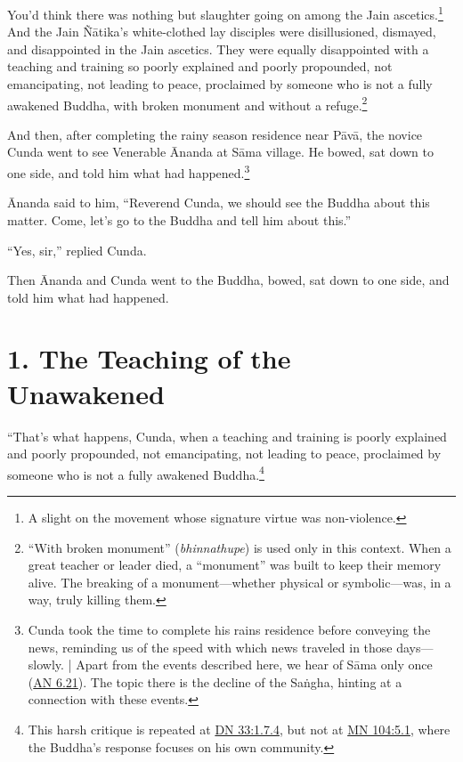 \documentclass[12pt,openany]{book}%
\begin{document}
You’d think there was nothing but slaughter going on among the Jain ascetics.\footnote{A slight on the movement whose signature virtue was non-violence. } And the Jain \textsanskrit{Ñātika}’s white-clothed lay disciples were disillusioned, dismayed, and disappointed in the Jain ascetics. They were equally disappointed with a teaching and training so poorly explained and poorly propounded, not emancipating, not leading to peace, proclaimed by someone who is not a fully awakened Buddha, with broken monument and without a refuge.\footnote{“With broken monument” (\textit{bhinnathupe}) is used only in this context. When a great teacher or leader died, a “monument” was built to keep their memory alive. The breaking of a monument—whether physical or symbolic—was, in a way, truly killing them. } 

And then, after completing the rainy season residence near \textsanskrit{Pāvā}, the novice Cunda went to see Venerable Ānanda at \textsanskrit{Sāma} village. He bowed, sat down to one side, and told him what had happened.\footnote{Cunda took the time to complete his rains residence before conveying the news, reminding us of the speed with which news traveled in those days—slowly. | Apart from the events described here, we hear of \textsanskrit{Sāma} only once (\href{https://suttacentral.net/an6.21/en/sujato}{AN 6.21}). The topic there is the decline of the \textsanskrit{Saṅgha}, hinting at a connection with these events. } 

Ānanda said to him, “Reverend Cunda, we should see the Buddha about this matter. Come, let’s go to the Buddha and tell him about this.” 

“Yes, sir,” replied Cunda. 

Then Ānanda and Cunda went to the Buddha, bowed, sat down to one side, and told him what had happened. 

\section*{1. The Teaching of the Unawakened }

“That’s what happens, Cunda, when a teaching and training is poorly explained and poorly propounded, not emancipating, not leading to peace, proclaimed by someone who is not a fully awakened Buddha.\footnote{This harsh critique is repeated at \href{https://suttacentral.net/dn33/en/sujato\#1.7.4}{DN 33:1.7.4}, but not at \href{https://suttacentral.net/mn104/en/sujato\#5.1}{MN 104:5.1}, where the Buddha’s response focuses on his own community. } 
\end{document}
